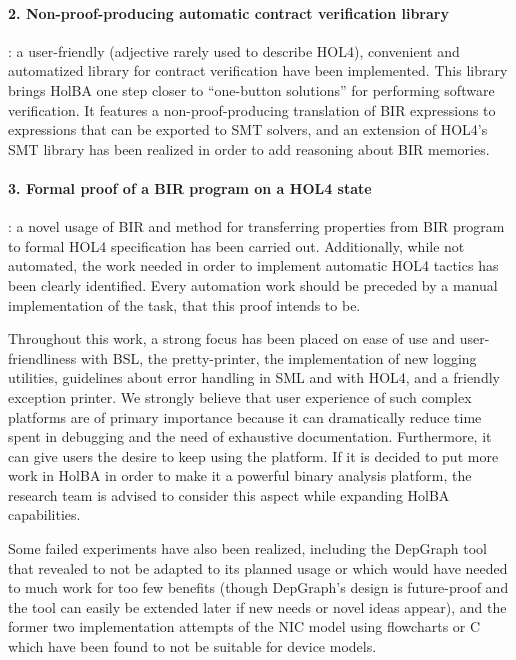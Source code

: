 \documentclass[10pt,a4paper]{article}
\begin{document}
\begin{multicols}{2}
\paragraph{2. Non-proof-producing automatic contract verification library}: a user-friendly (adjective rarely used to describe HOL4), convenient and automatized library for contract verification have been implemented. This library brings HolBA one step closer to ``one-button solutions'' for performing software verification. It features a non-proof-producing translation of BIR expressions to expressions that can be exported to SMT solvers, and an extension of HOL4's SMT library has been realized in order to add reasoning about BIR memories.

\vspace{-8pt}
\paragraph{3. Formal proof of a BIR program on a HOL4 state}: a novel usage of BIR and method for transferring properties from BIR program to formal HOL4 specification has been carried out. Additionally, while not automated, the work needed in order to implement automatic HOL4 tactics has been clearly identified. Every automation work should be preceded by a manual implementation of the task, that this proof intends to be.

Throughout this work, a strong focus has been placed on ease of use and user-friendliness with BSL, the pretty-printer, the implementation of new logging utilities, guidelines about error handling in SML and with HOL4, and a friendly exception printer. We strongly believe that user experience of such complex platforms are of primary importance because it can dramatically reduce time spent in debugging and the need of exhaustive documentation. Furthermore, it can give users the desire to keep using the platform. If it is decided to put more work in HolBA in order to make it a powerful binary analysis platform, the research team is advised to consider this aspect while expanding HolBA capabilities.

Some failed experiments have also been realized, including the DepGraph tool that revealed to not be adapted to its planned usage or which would have needed to much work for too few benefits (though DepGraph's design is future-proof and the tool can easily be extended later if new needs or novel ideas appear), and the former two implementation attempts of the NIC model using flowcharts or C which have been found to not be suitable for device models.


\end{multicols}
\end{document}
